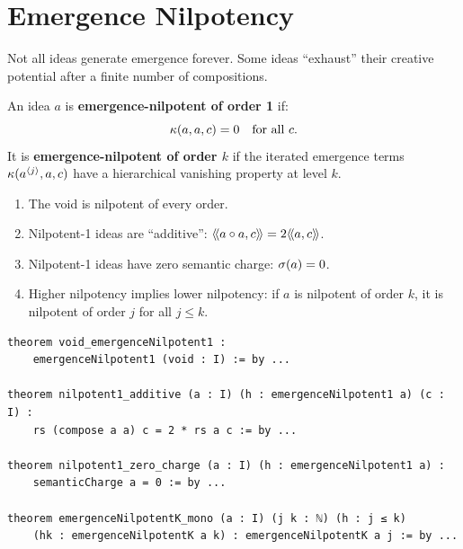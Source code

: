 \section{Emergence Nilpotency}

Not all ideas generate emergence forever. Some ideas ``exhaust'' their creative
potential after a finite number of compositions.

\begin{definition}
\label{def:nilpotent}
An idea $a$ is \textbf{emergence-nilpotent of order 1} if:
\[
  \kappa(a, a, c) = 0 \quad \text{for all } c.
\]
It is \textbf{emergence-nilpotent of order $k$} if the iterated emergence terms
$\kappa(a^{\langle j \rangle}, a, c)$ have a hierarchical vanishing property at level $k$.
\end{definition}

\begin{theorem}
\label{thm:nilpotent-properties}
\begin{enumerate}
  \item The void is nilpotent of every order.
  \item Nilpotent-1 ideas are ``additive'': $\langle\!\langle a \circ a, c \rangle\!\rangle = 2\langle\!\langle a, c \rangle\!\rangle$.
  \item Nilpotent-1 ideas have zero semantic charge: $\sigma(a) = 0$.
  \item Higher nilpotency implies lower nilpotency: if $a$ is nilpotent of order
    $k$, it is nilpotent of order $j$ for all $j \leq k$.
\end{enumerate}
\end{theorem}

\begin{lstlisting}[caption={Emergence nilpotency (IDT\_v3\_Emergence.lean)}]
theorem void_emergenceNilpotent1 :
    emergenceNilpotent1 (void : I) := by ...

theorem nilpotent1_additive (a : I) (h : emergenceNilpotent1 a) (c : I) :
    rs (compose a a) c = 2 * rs a c := by ...

theorem nilpotent1_zero_charge (a : I) (h : emergenceNilpotent1 a) :
    semanticCharge a = 0 := by ...

theorem emergenceNilpotentK_mono (a : I) (j k : ℕ) (h : j ≤ k)
    (hk : emergenceNilpotentK a k) : emergenceNilpotentK a j := by ...
\end{lstlisting}

